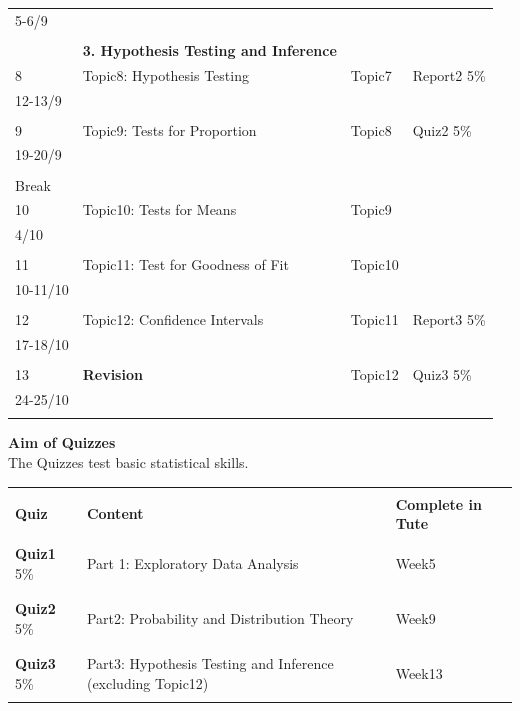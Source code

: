 \documentclass[bigtut]{quiz}\usepackage[]{graphicx}\usepackage[]{color}
\begin{document}
\begin{tutorial}
{\begin{tabular}{|l|l|l|l|}
5-6/9 &  & & \\ 
& & & \\ \hline
 &  {\bf 3. Hypothesis Testing and Inference} &  & \\ \hline
8 &  Topic8: Hypothesis Testing  & Topic7 & Report2 5\% \\
12-13/9 &  &  &  \\ 
& & & \\ \hline
9 & Topic9: Tests for Proportion & Topic8  & Quiz2 5\%  \\
19-20/9 &  & &   \\ 
& & & \\ \hline
Break & & & \\ \hline
10 & Topic10: Tests for Means & Topic9 & \\
4/10 & & & \\ 
& & & \\ \hline
11 & Topic11: Test for Goodness of Fit    & Topic10 & \\
10-11/10 &    & & \\ 
& & & \\ \hline
12 & Topic12: Confidence Intervals  & Topic11 & Report3 5\% \\
17-18/10 &  & &  \\ 
& & & \\ \hline
13 & {\bf Revision} & Topic12 & Quiz3 5\% \\
24-25/10 & &  &   \\
& & & \\ \hline
\end{tabular} }



\newpage
{\bf Aim of Quizzes} \\
The Quizzes test basic statistical skills.   

{\small \begin{tabular}{|l|l|l|} \hline  
& & \\ 
 {\bf Quiz} \hspace{1cm} & {\bf Content} & {\bf Complete in Tute}  \\  [2ex]  \hline 
 & & \\ 
 {\bf Quiz1}  5\%  & Part 1: Exploratory Data Analysis &  Week5 \\
& &    \\ [2ex]  \hline 
& & \\ 
 {\bf Quiz2} 5\% & Part2: Probability and Distribution Theory &  Week9  \\
  & &  \\  [2ex]   \hline 
  & & \\  
{\bf Quiz3} 5\% & Part3: Hypothesis Testing and Inference (excluding Topic12) & Week13 \\
    & &   \\  [2ex]   \hline 
\end{tabular} }


\end{tutorial}
\end{document}
